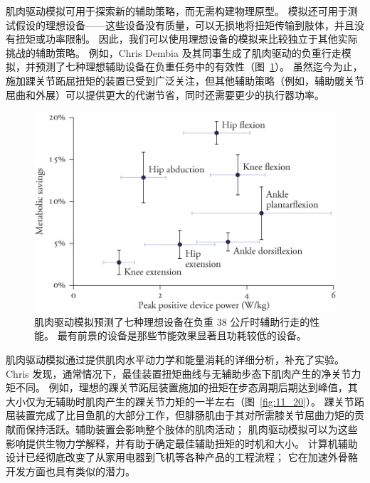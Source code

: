 肌肉驱动模拟可用于探索新的辅助策略，而无需构建物理原型。
模拟还可用于测试假设的理想设备——这些设备没有质量，可以无损地将扭矩传输到肢体，并且没有扭矩或功率限制。
因此，我们可以使用理想设备的模拟来比较独立于其他实际挑战的辅助策略。
例如，Chris Dembia 及其同事生成了肌肉驱动的负重行走模拟，并预测了七种理想辅助设备在负重任务中的有效性（图~\ref{fig:11_19}）。
虽然迄今为止，施加踝关节跖屈扭矩的装置已受到广泛关注，但其他辅助策略（例如，辅助髋关节屈曲和外展）可以提供更大的代谢节省，同时还需要更少的执行器功率。


\begin{figure}[!htb]
	\centering
	\includegraphics[width=0.8\linewidth]{chap11/11_19}
	\caption{肌肉驱动模拟预测了七种理想设备在负重 38 公斤时辅助行走的性能。
		最有前景的设备是那些节能效果显著且功耗较低的设备\cite{dembia2017simulating}。 \label{fig:11_19}}
\end{figure}


肌肉驱动模拟通过提供肌肉水平动力学和能量消耗的详细分析，补充了实验。
Chris 发现，通常情况下，最佳装置扭矩曲线与无辅助步态下肌肉产生的净关节力矩不同。
例如，理想的踝关节跖屈装置施加的扭矩在步态周期后期达到峰值，其大小仅为无辅助时肌肉产生的踝关节力矩的一半左右（图~\ref{fig:11_20}）。
踝关节跖屈装置完成了比目鱼肌的大部分工作，但腓肠肌由于其对所需膝关节屈曲力矩的贡献而保持活跃。辅助装置会影响整个肢体的肌肉活动；
肌肉驱动模拟可以为这些影响提供生物力学解释，并有助于确定最佳辅助扭矩的时机和大小。
计算机辅助设计已经彻底改变了从家用电器到飞机等各种产品的工程流程；
它在加速外骨骼开发方面也具有类似的潜力。


